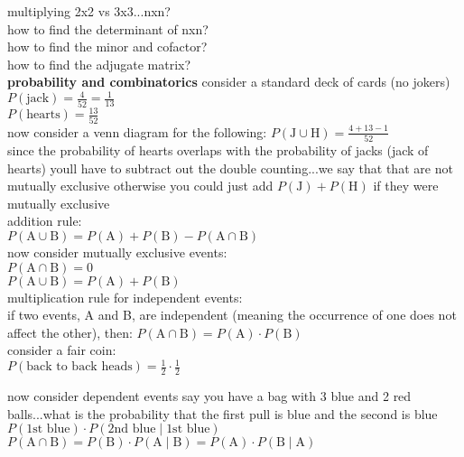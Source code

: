 \documentclass{article}
\begin{document}
multiplying 2x2 vs 3x3...nxn?\\
how to find the determinant of nxn?\\
how to find the minor and cofactor?\\
how to find the adjugate matrix?\\



\textbf{probability and combinatorics}
consider a standard deck of cards (no jokers)\\
$P(\text{jack}) = \frac{4}{52} = \frac{1}{13}$\\
$P(\text{hearts}) = \frac{13}{52}$\\

now consider a venn diagram for the following:
$P(\text{J} \cup \text{H}) = \frac{4 + 13 - 1}{52}$\\
since the probability of hearts overlaps with the probability of jacks (jack of hearts) youll have to subtract out the double counting...we say that that are not mutually exclusive otherwise you could just add $P(\text{J}) + P(\text{H})$ if they were mutually exclusive\\

addition rule:\\
$P(\text{A} \cup \text{B}) = P(\text{A}) + P(\text{B}) - P(\text{A} \cap \text{B})$\\

now consider mutually exclusive events:\\
$P(\text{A} \cap \text{B}) = 0$\\
$P(\text{A} \cup \text{B}) = P(\text{A}) + P(\text{B})$\\

multiplication rule for independent events:\\
if two events, A and B, are independent (meaning the occurrence of one does not affect the other), then: $P(\text{A} \cap \text{B}) = P(\text{A}) \cdot P(\text{B})$\\

consider a fair coin:\\
$P(\text{back to back heads}) = \frac{1}{2} \cdot \frac{1}{2}$

now consider dependent events say you have a bag with 3 blue and 2 red balls...what is the probability that the first pull is blue and the second is blue\\
$P(\text{1st blue}) \cdot P(\text{2nd blue} \mid \text{1st blue})$\\

$P(\text{A} \cap \text{B}) = P(\text{B}) \cdot P(\text{A} \mid \text{B}) = P(\text{A}) \cdot P(\text{B} \mid \text{A})$\\
\end{document}
